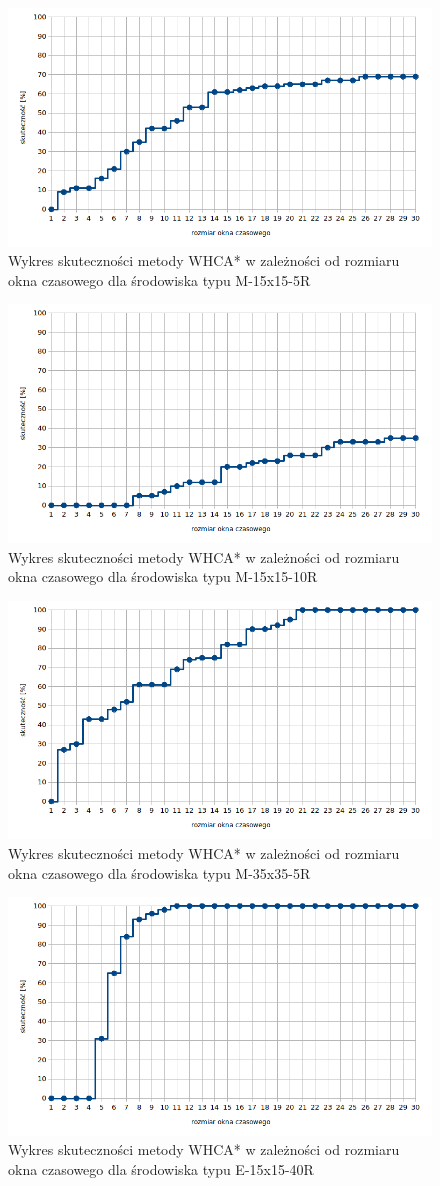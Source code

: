 \begin{figure}
	\centering
	\includegraphics[width=0.6\columnwidth]{img/plots/test-whca-window-M-15x15-5R}
	\caption{Wykres skuteczności metody WHCA* w zależności od rozmiaru okna czasowego dla środowiska typu M-15x15-5R}
	\label{fig:test-whca-window-M-15x15-5R}
\end{figure}
\begin{figure}
	\centering
	\includegraphics[width=0.6\columnwidth]{img/plots/test-whca-window-M-15x15-10R}
	\caption{Wykres skuteczności metody WHCA* w zależności od rozmiaru okna czasowego dla środowiska typu M-15x15-10R}
	\label{fig:test-whca-window-M-15x15-10R}
\end{figure}
\begin{figure}
	\centering
	\includegraphics[width=0.6\columnwidth]{img/plots/test-whca-window-M-35x35-5R}
	\caption{Wykres skuteczności metody WHCA* w zależności od rozmiaru okna czasowego dla środowiska typu M-35x35-5R}
	\label{fig:test-whca-window-M-35x35-5R}
\end{figure}
\begin{figure}
	\centering
	\includegraphics[width=0.6\columnwidth]{img/plots/test-whca-window-E-15x15-40R}
	\caption{Wykres skuteczności metody WHCA* w zależności od rozmiaru okna czasowego dla środowiska typu E-15x15-40R}
	\label{fig:test-whca-window-E-15x15-40R}
\end{figure}

